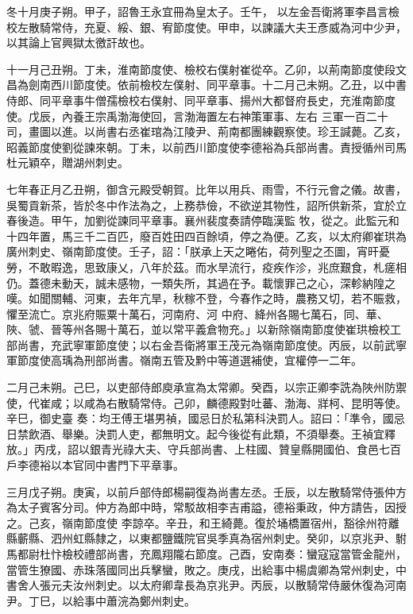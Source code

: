 \begin{pinyinscope}
 冬十月庚子朔。甲子，詔魯王永宜冊為皇太子。壬午，
 以左金吾衛將軍李昌言檢校左散騎常侍，充夏、綏、銀、宥節度使。甲申，以諫議大夫王彥威為河中少尹，以其論上官興獄太徼訐故也。



 十一月己丑朔。丁未，淮南節度使、檢校右僕射崔從卒。乙卯，以荊南節度使段文昌為劍南西川節度使。依前檢校左僕射、同平章事。十二月己未朔。乙丑，以中書侍郎、同平章事牛僧孺檢校右僕射、同平章事、揚州大都督府長史，充淮南節度使。戊辰，內養王宗禹渤海使回，言渤海置左右神策軍事、左右
 三軍一百二十司，畫圖以進。以尚書右丞崔琯為江陵尹、荊南都團練觀察使。珍王諴薨。乙亥，昭義節度使劉從諫來朝。丁未，以前西川節度使李德裕為兵部尚書。責授循州司馬杜元穎卒，贈湖州刺史。



 七年春正月乙丑朔，御含元殿受朝賀。比年以用兵、雨雪，不行元會之儀。故書，吳蜀貢新茶，皆於冬中作法為之，上務恭儉，不欲逆其物性，詔所供新茶，宜於立春後造。甲午，加劉從諫同平章事。襄州裴度奏請停臨漢監
 牧，從之。此監元和十四年置，馬三千二百匹，廢百姓田四百餘頃，停之為便。乙亥，以太府卿崔珙為廣州刺史、嶺南節度使。壬子，詔：「朕承上天之睠佑，荷列聖之丕圖，宵旰憂勞，不敢暇逸，思致康乂，八年於茲。而水旱流行，疫疾作沴，兆庶艱食，札瘥相仍。蓋德未動天，誠未感物，一類失所，其過在予。載懷罪己之心，深軫納隍之嘆。如聞關輔、河東，去年亢旱，秋稼不登，今春作之時，農務又切，若不賑救，懼至流亡。京兆府賑粟十萬石，河南府、河
 中府、絳州各賜七萬石，同、華、陜、虢、晉等州各賜十萬石，並以常平義倉物充。」以新除嶺南節度使崔珙檢校工部尚書，充武寧軍節度使；以右金吾衛將軍王茂元為嶺南節度使。丙辰，以前武寧軍節度使高瑀為刑部尚書。嶺南五管及黔中等道選補使，宜權停一二年。



 二月己未朔。己巳，以吏部侍郎庾承宣為太常卿。癸酉，以宗正卿李詵為陜州防禦使，代崔咸；以咸為右散騎常侍。己卯，麟德殿對吐蕃、渤海、牂柯、昆明等使。辛巳，御史臺
 奏：均王傅王堪男禎，國忌日於私第科決罰人。詔曰：「準令，國忌日禁飲酒、舉樂。決罰人吏，都無明文。起今後從有此類，不須舉奏。王禎宜釋放。」丙戌，詔以銀青光祿大夫、守兵部尚書、上柱國、贊皇縣開國伯、食邑七百戶李德裕以本官同中書門下平章事。



 三月戊子朔。庚寅，以前戶部侍郎楊嗣復為尚書左丞。壬辰，以左散騎常侍張仲方為太子賓客分司。仲方為郎中時，常駁故相李吉甫謚，德裕秉政，仲方請告，因授之。己亥，嶺南節度使
 李諒卒。辛丑，和王綺薨。復於埇橋置宿州，豁徐州符離縣蘄縣、泗州虹縣隸之，以東都鹽鐵院官吳季真為宿州刺史。癸卯，以京兆尹、駙馬都尉杜忭檢校禮部尚書，充鳳翔隴右節度。己酉，安南奏：蠻寇寇當管金龍州，當管生獠國、赤珠落國同出兵擊蠻，敗之。庚戌，出給事中楊虞卿為常州刺史，中書舍人張元夫汝州刺史。以太府卿韋長為京兆尹。丙辰，以散騎常侍嚴休復為河南尹。丁巳，以給事中蕭浣為鄭州刺史。




\end{pinyinscope}
